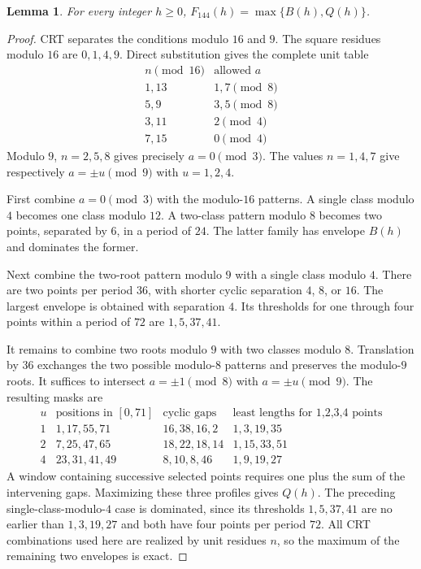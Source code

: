 \documentclass[11pt]{article}
\newtheorem{lemma}[theorem]{Lemma}
\begin{document}
\begin{lemma}\label{lem:envelope}
For every integer $h\ge0$, $F_{144}(h)=\max\{B(h),Q(h)\}$.
\end{lemma}
\begin{proof}
CRT separates the conditions modulo $16$ and $9$. The square residues
modulo $16$ are $0,1,4,9$. Direct substitution gives the complete unit table
\[
\begin{array}{c|c}
n\pmod {16}&\text{allowed }a\\ \hline
1,13&1,7\pmod8\\
5,9&3,5\pmod8\\
3,11&2\pmod4\\
7,15&0\pmod4
\end{array}
\]
Modulo $9$, $n=2,5,8$ gives precisely $a=0\pmod3$. The values $n=1,4,7$
give respectively $a=\pm u\pmod9$ with $u=1,2,4$.

First combine $a=0\pmod3$ with the modulo-$16$ patterns. A single class
modulo $4$ becomes one class modulo $12$. A two-class pattern modulo $8$
becomes two points, separated by $6$, in a period of $24$. The latter
family has envelope $B(h)$ and dominates the former.

Next combine the two-root pattern modulo $9$ with a single class modulo
$4$. There are two points per period $36$, with shorter cyclic separation
$4$, $8$, or $16$. The largest envelope is obtained with separation $4$.
Its thresholds for one through four points within a period of $72$ are
$1,5,37,41$.

It remains to combine two roots modulo $9$ with two classes modulo $8$.
Translation by $36$ exchanges the two possible modulo-$8$ patterns and
preserves the modulo-$9$ roots. It suffices to intersect $a=\pm1\pmod8$
with $a=\pm u\pmod9$. The resulting masks are
\[
\begin{array}{c|l|l|l}
u&\text{positions in }[0,71]&\text{cyclic gaps}&
 \text{least lengths for 1,2,3,4 points}\\ \hline
1&1,17,55,71&16,38,16,2&1,3,19,35\\
2&7,25,47,65&18,22,18,14&1,15,33,51\\
4&23,31,41,49&8,10,8,46&1,9,19,27
\end{array}
\]
A window containing successive selected points requires one plus the sum
of the intervening gaps. Maximizing these three profiles gives $Q(h)$.
The preceding single-class-modulo-$4$ case is dominated, since its
thresholds $1,5,37,41$ are no earlier than $1,3,19,27$ and both have four
points per period $72$. All CRT combinations used here are realized by
unit residues $n$, so the maximum of the remaining two envelopes is exact.
\end{proof}
\end{document}
